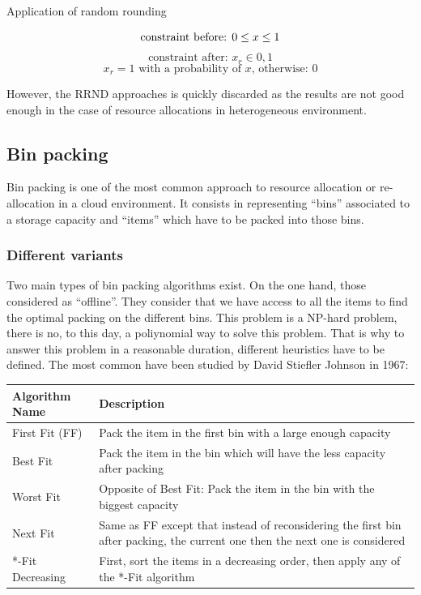 \documentclass[a4paper,11pt]{article}
\begin{document}
\begin{figequation}
	\caption{Application of random rounding}
	\[
		\text{constraint before: } 0 \leq x \leq 1 \\
	\]
	\[
		\text{constraint after: } x_r \in {0, 1}
	\]
	\[
		x_r = 1 \text{ with a probability of $x$, otherwise: $0$}
	\]
\end{figequation}

However, the RRND approaches is quickly discarded as the results are not good
enough in the case of resource allocations in heterogeneous environment.

\subsection{Bin packing}

Bin packing is one of the most common approach to resource allocation or
re-allocation in a cloud environment. It consists in representing “bins”
associated to a storage capacity and “items” which have to be packed into
those bins.

\subsubsection{Different variants}

Two main types of bin packing algorithms exist. On the one hand, those
considered as “offline”. They consider that we have access to all the items to
find the optimal packing on the different bins. This problem is a NP-hard
problem, there is no, to this day, a poliynomial way to solve this problem.
That is why to answer this problem in a reasonable duration, different
heuristics have to be defined. The most common have been studied by David
Stiefler Johnson in 1967\cite{maths:bpheuristics}:

\vspace{1em}
\begin{center}
	\begin{tabular}{| l | p{7cm} |}
		\hline
		Algorithm Name & Description \\
		\hline
		First Fit (FF) & Pack the item in the first bin with a large enough capacity \\
		\hline
		Best Fit & Pack the item in the bin which will have the less capacity after packing \\
		\hline
		Worst Fit & Opposite of Best Fit: Pack the item in the bin with the biggest capacity \\
		\hline
		Next Fit & Same as FF except that instead of reconsidering the first bin after packing, the current one then the next one is considered \\
		\hline
		*-Fit Decreasing & First, sort the items in a decreasing order, then apply any of the *-Fit algorithm \\
		\hline
	\end{tabular}
\end{center}
\vspace{1em}
\end{document}
